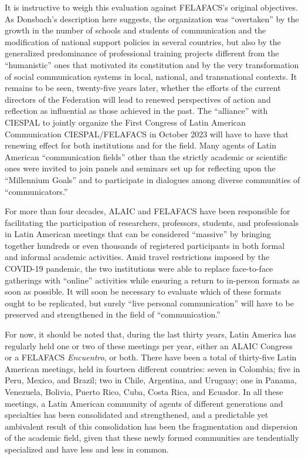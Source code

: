 \documentclass{tufte-handout}
\begin{document}
\noindent It is instructive to weigh this evaluation against FELAFACS's original
objectives. As Donsbach's description here suggests, the organization
was ``overtaken'' by the growth in the number of schools and students of
communication and the modification of national support policies in
several countries, but also by the generalized predominance of
professional training projects different from the ``humanistic'' ones
that motivated its constitution and by the very transformation of social
communication systems in local, national, and transnational contexts. It
remains to be seen, twenty-five years later, whether the efforts of the
current directors of the Federation will lead to renewed perspectives of
action and reflection as influential as those achieved in the past. The
``alliance'' with CIESPAL to jointly organize the First Congress of
Latin American Communication CIESPAL/FELAFACS in October 2023 will have
to have that renewing effect for both institutions and for the field.
Many agents of Latin American ``communication fields'' other than the
strictly academic or scientific ones were invited to join panels and
seminars set up for reflecting upon the ``Millennium Goals'' and to
participate in dialogues among diverse communities of ``communicators.''

For more than four decades, ALAIC and FELAFACS have been responsible for
facilitating the participation of researchers, professors, students, and
professionals in Latin American meetings that can be considered
``massive'' by bringing together hundreds or even thousands of
registered participants in both formal and informal academic activities.
Amid travel restrictions imposed by the COVID-19 pandemic, the two
institutions were able to replace face-to-face gatherings with
``online'' activities while ensuring a return to in-person formats as
soon as possible. It will soon be necessary to evaluate which of these
formats ought to be replicated, but surely ``live personal
communication'' will have to be preserved and strengthened in the field
of ``communication.''

For now, it should be noted that, during the last thirty years, Latin
America has regularly held one or two of these meetings per year, either
an ALAIC Congress or a FELAFACS \emph{Encuentro}, or both. There have
been a total of thirty-five Latin American meetings, held in fourteen
different countries: seven in Colombia; five in Peru, Mexico, and
Brazil; two in Chile, Argentina, and Uruguay; one in Panama, Venezuela,
Bolivia, Puerto Rico, Cuba, Costa Rica, and Ecuador. In all these
meetings, a Latin American community of agents of different generations
and specialties has been consolidated and strengthened, and a
predictable yet ambivalent result of this consolidation has been the
fragmentation and dispersion of the academic field, given that these
newly formed communities are tendentially specialized and have less and
less in common.
\end{document}
